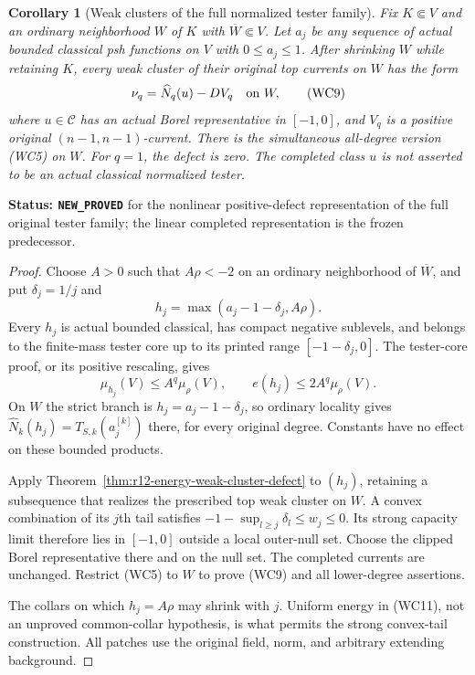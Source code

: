 \documentclass[11pt,a4paper]{article}
\numberwithin{equation}{section}
\newtheorem{corollary}[theorem]{Corollary}
\theoremstyle{definition}
\theoremstyle{remark}
\begin{document}
\begin{corollary}[Weak clusters of the full normalized tester family]
\label{cor:r12-full-tester-positive-defect}
Fix $K\Subset V$ and an ordinary neighborhood $W$ of $K$ with
$\overline W\Subset V$.  Let $a_j$ be any sequence of actual
bounded classical psh functions on $V$ with $0\leq a_j\leq1$.
After shrinking $W$ while retaining $K$, every weak cluster of
their original top currents on $W$ has the form
\[
                  \nu_q=\widehat N_q(u)-DV_q\quad\hbox{on }W,
 \tag{WC9}
\]
where $u\in\mathcal C$ has an actual Borel representative in
$[-1,0]$, and $V_q$ is a positive original $(n-1,n-1)$-current.
There is the simultaneous all-degree version (WC5) on $W$.
For $q=1$, the defect is zero.  The completed class $u$ is not
asserted to be an actual classical normalized tester.
\end{corollary}

\noindent\textbf{Status: \texttt{NEW\_PROVED}} for the nonlinear
positive-defect representation of the full original tester family;
the linear completed representation is the frozen predecessor.

\begin{proof}
Choose $A>0$ such that $A\rho<-2$ on an ordinary neighborhood of
$\overline W$, and put $\delta_j=1/j$ and
\[
                   h_j=\max(a_j-1-\delta_j,A\rho).
 \tag{WC10}
\]
Every $h_j$ is actual bounded classical, has compact negative
sublevels, and belongs to the finite-mass tester core up to its
printed range $[-1-\delta_j,0]$.  The tester-core proof, or its
positive rescaling, gives
\[
 \mu_{h_j}(V)\leq A^q\mu_\rho(V),\qquad
                   e(h_j)\leq2A^q\mu_\rho(V).
 \tag{WC11}
\]
On $W$ the strict branch is $h_j=a_j-1-\delta_j$, so ordinary
locality gives $\widehat N_k(h_j)=T_{S,k}(a_j^{[k]})$ there,
for every original degree.  Constants have no effect on these
bounded products.

Apply Theorem~\ref{thm:r12-energy-weak-cluster-defect} to $(h_j)$,
retaining a subsequence that realizes the prescribed top weak
cluster on $W$.  A convex combination of its $j$th tail satisfies
$-1-\sup_{l\geq j}\delta_l\leq w_j\leq0$.  Its strong capacity
limit therefore lies in $[-1,0]$ outside a local outer-null set.
Choose the clipped Borel representative there and on the null
set.  The completed currents are unchanged.  Restrict (WC5) to
$W$ to prove (WC9) and all lower-degree assertions.

The collars on which $h_j=A\rho$ may shrink with $j$.  Uniform
energy in (WC11), not an unproved common-collar hypothesis, is
what permits the strong convex-tail construction.  All patches
use the original field, norm, and arbitrary extending background.
\end{proof}
\end{document}
